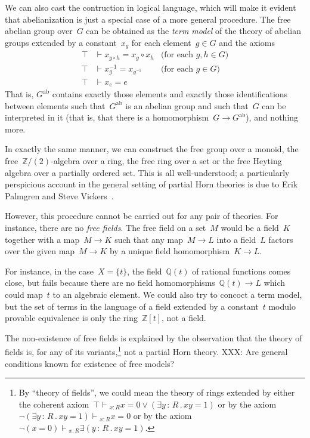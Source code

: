 \documentclass{ws-rv9x6}
\newcommand{\QQ}{\mathbb{Q}}
\newcommand{\ZZ}{\mathbb{Z}}
\newcommand{\ab}{\mathrm{ab}}
\renewcommand{\_}{\mathpunct{.}}
\newcommand{\?}{\,{:}\,}
\newcommand{\seq}[1]{\mathrel{\vdash\!\!\!_{#1}}}
\begin{document}
We can also cast the contruction in logical language, which will make it
evident that abelianization is just a special case of a more general procedure.
The free abelian group over~$G$ can be obtained as the \emph{term model} of the
theory of abelian groups extended by a constant~$x_g$ for each element~$g \in
G$ and the axioms
\begin{align*}
  \top &\vdash x_{g \circ h} = x_g \circ x_h & \text{(for each~$g,h \in G$)} \\
  \top &\vdash x_g^{-1} = x_{g^{-1}} & \text{(for each~$g \in G$)} \\
  \top &\vdash x_e = e
\end{align*}
That is, $G^\ab$ contains exactly those elements and exactly those
identifications between elements such that~$G^\ab$ is an abelian group and such
that~$G$ can be interpreted in it (that is, that there is a homomorphism~$G \to
G^\ab$), and nothing more.

In exactly the same manner, we can construct the free group over a monoid, the
free~$\ZZ/(2)$-algebra over a ring, the free ring over a set or the free
Heyting algebra over a partially ordered set. This is all well-understood; a
particularly perspicious account in the general setting of partial Horn
theories is due to Erik Palmgren and Steve Vickers~\cite{palmgren-vickers:partial-horn}.

However, this procedure cannot be carried out for any pair of theories. For
instance, there are no \emph{free fields}. The free field on a set~$M$ would be
a field~$K$ together with a map~$M \to K$ such that any map~$M \to L$ into a field~$L$ factors
over the given map~$M \to K$ by a unique field homomorphism~$K \to L$.

For instance, in the case~$X = \{ t \}$, the field~$\QQ(t)$ of rational
functions comes close, but fails because there are no field homomorphisms~$\QQ(t)
\to L$ which could map~$t$ to an algebraic element. We could also try to
concoct a term model, but the set of terms in the language of a field extended
by a constant~$t$ modulo provable equivalence is only the ring~$\ZZ[t]$, not a
field.

The non-existence of free fields is explained by the observation that the
theory of fields is, for any of its variants,\footnote{By ``theory of fields'',
we could mean the theory of rings extended by either the coherent axiom~$\top
\seq{x:R} x = 0 \vee (\exists y\?R\_ xy = 1)$ or by the axiom~$\neg(\exists
y\?R\_ xy = 1) \seq{x:R} x = 0$ or by the axiom~$\neg(x = 0) \seq{x:R} \exists
(y\?R\_ xy = 1)$.} not a partial Horn theory.
XXX: Are general conditions known for existence of free models?
\end{document}
